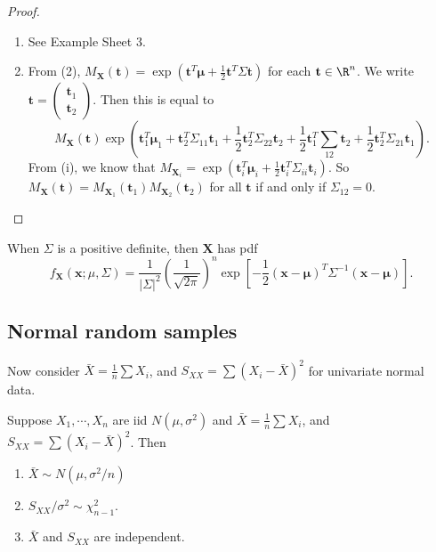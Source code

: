 \documentclass[a4paper]{article}
\begin{document}
\begin{proof}\leavevmode
  \begin{enumerate}
    \item See Example Sheet 3.
    \item From (2), $M_\mathbf{X}(\mathbf{t}) = \exp(\mathbf{t}^T \boldsymbol\mu + \frac{1}{2}\mathbf{t}^T\Sigma\mathbf{t})$ for each $\mathbf{t}\in \R^n$. We write $\mathbf{t} = \begin{pmatrix}\mathbf{t}_1\\\mathbf{t}_2\end{pmatrix}$. Then this is equal to
      \[
        M_\mathbf{X}(\mathbf{t})\exp(\mathbf{t}_1^T\boldsymbol\mu_1 + \mathbf{t}_2^T \Sigma_{11}\mathbf{t}_1 + \frac{1}{2}\mathbf{t}_2^T \Sigma_{22}\mathbf{t}_2 + \frac{1}{2}\mathbf{t}_1^T \sum_{12}\mathbf{t}_2 + \frac{1}{2}\mathbf{t}_2^T \Sigma_{21}\mathbf{t}_1).
      \]
      From (i), we know that $M_{\mathbf{X}_i} = \exp(\mathbf{t}_i^T\boldsymbol\mu_i + \frac{1}{2}\mathbf{t}_i^T \Sigma_{ii}\mathbf{t}_i)$. So $M_\mathbf{X}(\mathbf{t}) = M_{\mathbf{X}_1}(\mathbf{t}_1)M_{\mathbf{X}_2}(\mathbf{t}_2)$ for all $\mathbf{t}$ if and only if $\Sigma_{12} = 0$.
  \end{enumerate}
\end{proof}

\begin{prop}
  When $\Sigma$ is a positive definite, then $\mathbf{X}$ has pdf
  \[
    f_\mathbf{X}(\mathbf{x}; \mu, \Sigma) = \frac{1}{|\Sigma|^2} \left(\frac{1}{\sqrt{2\pi}}\right)^n \exp\left[-\frac{1}{2}(\mathbf{x} - \boldsymbol\mu)^T\Sigma^{-1}(\mathbf{x} - \boldsymbol\mu)\right].
  \]
\end{prop}
\subsection{Normal random samples}
Now consider $\bar X = \frac{1}{n}\sum X_i$, and $S_{XX} = \sum(X_i - \bar X)^2$ for univariate normal data.

\begin{thm}
  Suppose $X_1, \cdots, X_n$ are iid $N(\mu, \sigma^2)$ and $\bar X = \frac{1}{n} \sum X_i$, and $S_{XX} = \sum (X_i - \bar X)^2$. Then
  \begin{enumerate}
    \item $\bar X \sim N(\mu, \sigma^2/n)$
    \item $S_{XX}/\sigma^2 \sim \chi_{n - 1}^2$.
    \item $\bar X$ and $S_{XX}$ are independent.
  \end{enumerate}
\end{thm}
\end{document}
